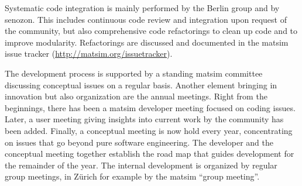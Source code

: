 Systematic code integration is mainly performed by the Berlin group and by \gls{senozon}. 
This includes continuous code review and integration upon request of the community, but also comprehensive code refactorings to clean up
code and to 
improve modularity.  Refactorings are discussed and documented in the \gls{matsim} issue tracker (\url{http://matsim.org/issuetracker}).

The development process is supported by a standing \gls{matsim} committee discussing conceptual issues on a regular basis. 
Another element bringing in innovation but also organization are the annual meetings. 
Right from the beginnings, there has been a \gls{matsim} developer meeting focused on coding issues. 
Later, a user meeting giving insights into current work by the community has been added.
Finally, a conceptual meeting is now hold every year,
concentrating on issues that go beyond pure software engineering. 
The developer and the conceptual meeting 
together establish the road map that guides development for the remainder of the year. 
%
The internal development is organized by regular group meetings, in Zürich for example by the \gls{matsim} ``group meeting''.

%



